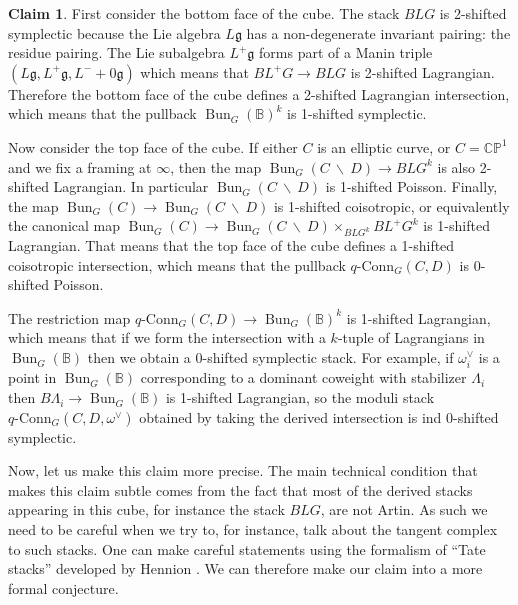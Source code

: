 \documentclass[11pt, oneside, reqno]{amsart}
\theoremstyle{definition} \newtheorem{definition}{Definition}[section]
\newtheorem*{claim}{Claim}
\theoremstyle{definition} \newtheorem{remark}[definition]{Remark}
\theoremstyle{definition} \newtheorem{remarks}[definition]{Remarks}
\theoremstyle{definition} \newtheorem{question}[definition]{Question}
\theoremstyle{definition} \newtheorem*{note}{Note}
\theoremstyle{definition} \newtheorem{example}[definition]{Example}
\theoremstyle{definition} \newtheorem{examples}[definition]{Examples}
\renewcommand{\gg}{\mathfrak{g}}
\newcommand{\bb}[1]{\mathbb{#1}}
\newcommand{\bs}{\ \backslash \ }
\DeclareMathOperator{\bun}{Bun}
\newcommand{\qconn}{q\text{-Conn}}
\begin{document}
\begin{claim}
First consider the bottom face of the cube.  The stack $BLG$ is 2-shifted symplectic because the Lie algebra $L\gg$ has a non-degenerate invariant pairing: the residue pairing.  The Lie subalgebra $L^+\gg$ forms part of a Manin triple $(L\gg, L^+\gg, L^-+0\gg)$ which means that $BL^+G \to BLG$ is 2-shifted Lagrangian.  Therefore the bottom face of the cube defines a 2-shifted Lagrangian intersection, which means that the pullback $\bun_G(\bb B)^k$ is 1-shifted symplectic.

Now consider the top face of the cube.  If either $C$ is an elliptic curve, or $C=\bb{CP}^1$ and we fix a framing at $\infty$, then the map $\bun_G(C \bs D) \to BLG^k$ is also 2-shifted Lagrangian.  In particular $\bun_G(C \bs D)$ is 1-shifted Poisson.  Finally, the map $\bun_G(C) \to \bun_G(C \bs D)$ is 1-shifted coisotropic, or equivalently the canonical map $\bun_G(C) \to \bun_G(C \bs D) \times_{BLG^k} BL^+G^k$ is 1-shifted Lagrangian.  That means that the top face of the cube defines a 1-shifted coisotropic intersection, which means that the pullback $\qconn_G(C,D)$ is 0-shifted Poisson.

The restriction map $\qconn_G(C,D) \to \bun_G(\bb B)^k$ is 1-shifted Lagrangian, which means that if we form the intersection with a $k$-tuple of Lagrangians in $\bun_G(\bb B)$ then we obtain a 0-shifted symplectic stack.  For example, if $\omega_i^\vee$ is a point in $\bun_G(\bb B)$ corresponding to a dominant coweight with stabilizer $\Lambda_i$ then $B \Lambda_i \to \bun_G(\bb B)$ is 1-shifted Lagrangian, so the moduli stack $\qconn_G(C,D, \omega^\vee)$ obtained by taking the derived intersection is ind 0-shifted symplectic.
\end{claim}

Now, let us make this claim more precise.  The main technical condition that makes this claim subtle comes from the fact that most of the derived stacks appearing in this cube, for instance the stack $BLG$, are not Artin.  As such we need to be careful when we try to, for instance, talk about the tangent complex to such stacks.  One can make careful statements using the formalism of ``Tate stacks'' developed by Hennion \cite{Hennion}.  We can therefore make our claim into a more formal conjecture.
\end{document}
